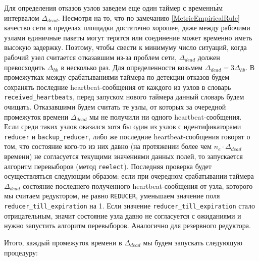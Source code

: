 Для определения отказов узлов заведем еще один таймер с временн\'{ы}м интервалом $\Delta_{dead}$. Несмотря на то, что по замечанию \ref{MetricEmpiricalRule} качество сети в пределах площадки достаточно хорошее, даже между рабочими узлами единичные пакеты могут терятся или соединение может временно иметь высокую задержку. Поэтому, чтобы свести к минимуму число ситуаций, когда рабочий узел считается отказавшим из-за проблем сети, $\Delta_{dead}$ должен превосходить $\Delta_{hb}$ в несколько раз. Для определенности возьмем $\Delta_{dead} = 3\Delta_{hb}$. В промежутках между срабатываниями таймера по детекции отказов будем сохранять последние heartbeat-со\-об\-ще\-ния от каждого из узлов в словарь \texttt{re\-cei\-ved\_heart\-beats}, перед запуском нового таймера данный словарь будем очищать. Отказавшими будем считать те узлы, от которых за очередной промежуток времени $\Delta_{dead}$ мы не получили ни одного heartbeat-со\-об\-ще\-ния. Если среди таких узлов оказался хотя бы один из узлов с идентификаторами \texttt{reducer} и \texttt{backup\_reducer}, либо же последние heartbeat-со\-об\-ще\-ния говорят о том, что состояние кого-то из них давно (на протяжении более чем $n_e \cdot \Delta_{dead}$ времени) не согласуется текущими значениями данных полей, то запускается алгоритм перевыборов (метод \texttt{reelect}). Последняя проверка будет осуществляться следующим образом: если при очередном срабатывании таймера $\Delta_{dead}$ состояние последнего полученного heartbeat-со\-об\-ще\-ния от узла, которого мы считаем редуктором, не равно \texttt{REDUCER}, уменьшаем значение поля \texttt{reducer\_till\_expiration} на 1. Если значение \texttt{reducer\_till\_expiration} стало отрицательным, значит состояние узла давно не согласуется с ожиданиями и нужно запустить алгоритм перевыборов. Аналогично для резервного редуктора.

Итого, каждый промежуток времени в $\Delta_{dead}$ мы будем запускать следующую процедуру:

